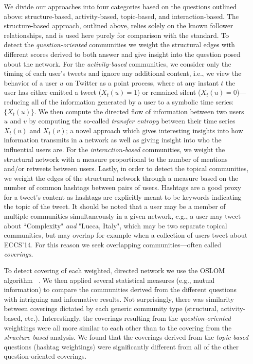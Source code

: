 \documentclass[10pt,a4paper]{article}
\begin{document}
We divide our approaches into four categories based on the questions outlined above: structure-based, activity-based, topic-based, and interaction-based. The structure-based approach, outlined above, relies solely on the known follower relationships, and is used here purely for comparison with the standard. To detect the \emph{question-oriented} communities we weight the structural edges with different scores derived to both answer and give insight into the question posed about the network. For the \emph{activity-based} communities, we consider only the timing of each user's tweets and ignore any additional content, i.e., we view the behavior of a user $u$ on Twitter as a point process, where at any instant $t$ the user has either emitted a tweet ($X_{t}(u) = 1$) or remained silent ($X_{t}(u) = 0$)---reducing all of the information generated by a user to a symbolic time series: $\{ X_{t}(u)\}$. We then compute the directed flow of information between two users $u$ and $v$ by computing the so-called \emph{transfer entropy} between their time series $X_{t}(u)$ and $X_{t}(v)$; a novel approach which gives interesting insights into how information transmits in a network as well as giving insight into who the influential users are. For the \emph{interaction-based} communities, we weight the structural network with a measure proportional to the number of mentions and/or retweets between users. Lastly, in order to detect the topical communities, we weight the edges of the structural network through a measure based on the number of common hashtags between pairs of users. Hashtags are a good proxy for a tweet's content as hashtags are explicitly meant to be keywords indicating the topic of the tweet. It should be noted that a user may be a member of multiple communities simultaneously in a given network, e.g., a user may tweet about ``Complexity" \emph{and} "Lucca, Italy", which may be two separate topical communities, but may overlap for example when a collection of users tweet about ECCS'14. For this reason we seek overlapping communities---often called \emph{coverings}.

To detect covering of each weighted, directed network we use the OSLOM algorithm~\cite{LancichinettiPlos} . We then applied several statistical measures (e.g., mutual information) to compare the communities derived from the different questions with intriguing and informative results.  Not surprisingly, there was similarity between coverings dictated by each generic community type (structural, activity-based, etc.).
Interestingly, the coverings resulting from the \emph{question-oriented} weightings were all more similar to each other than to the covering from the \emph{structure-based} analysis. We found that the coverings derived from the \emph{topic-based} questions (hashtag weightings) were significantly different from all of the other question-oriented coverings. 
\end{document}
